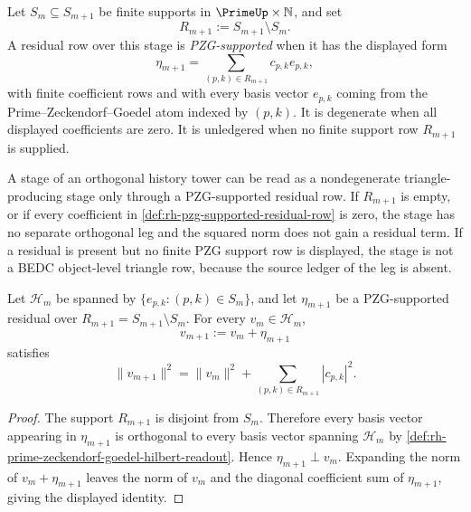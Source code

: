 \begin{definition}
\label{def:rh-pzg-supported-residual-row}
Let $S_m\subseteq S_{m+1}$ be finite supports in
$\PrimeUp\times\mathbb N$, and set
$$
R_{m+1}:=S_{m+1}\setminus S_m.
$$
A residual row over this stage is \emph{PZG-supported} when it has the
displayed form
$$
\eta_{m+1}
=
\sum_{(p,k)\in R_{m+1}}c_{p,k}e_{p,k},
$$
with finite coefficient rows and with every basis vector $e_{p,k}$
coming from the Prime--Zeckendorf--Goedel atom indexed by $(p,k)$. It is
degenerate when all displayed coefficients are zero. It is unledgered
when no finite support row $R_{m+1}$ is supplied.
\end{definition}

\begin{principle}
\label{prin:rh-pzg-support-nondegenerate-triangle-leg-criterion}
A stage of an orthogonal history tower can be read as a nondegenerate
triangle-producing stage only through a PZG-supported residual row. If
$R_{m+1}$ is empty, or if every coefficient in
\autoref{def:rh-pzg-supported-residual-row} is zero, the stage has no
separate orthogonal leg and the squared norm does not gain a residual
term. If a residual is present but no finite PZG support row is
displayed, the stage is not a BEDC object-level triangle row, because
the source ledger of the leg is absent.
\end{principle}

\begin{theorem}
\label{thm:rh-pzg-supported-stages-norm-square-growth}
Let $\mathcal H_m$ be spanned by $\{e_{p,k}:(p,k)\in S_m\}$, and let
$\eta_{m+1}$ be a PZG-supported residual over
$R_{m+1}=S_{m+1}\setminus S_m$. For every $v_m\in\mathcal H_m$,
$$
v_{m+1}:=v_m+\eta_{m+1}
$$
satisfies
$$
\|v_{m+1}\|^2
=
\|v_m\|^2+
\sum_{(p,k)\in R_{m+1}}|c_{p,k}|^2.
$$
\end{theorem}

\begin{proof}
The support $R_{m+1}$ is disjoint from $S_m$. Therefore every basis
vector appearing in $\eta_{m+1}$ is orthogonal to every basis vector
spanning $\mathcal H_m$ by
\autoref{def:rh-prime-zeckendorf-goedel-hilbert-readout}. Hence
$\eta_{m+1}\perp v_m$. Expanding the norm of
$v_m+\eta_{m+1}$ leaves the norm of $v_m$ and the diagonal coefficient
sum of $\eta_{m+1}$, giving the displayed identity.
\end{proof}

